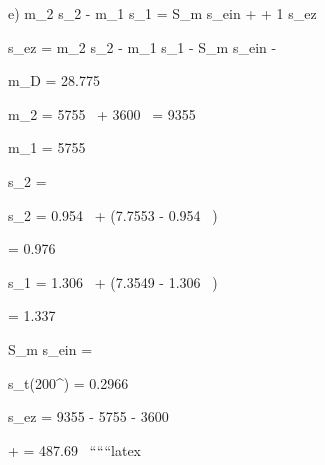 e) \quad m_2 s_2 - m_1 s_1 = S_m s_{ein} +  + 1 s_{ez}

\quad s_{ez} = m_2 s_2 - m_1 s_1 - S_m s_{ein} - 

 \quad m_D = 28.775 \, 

\quad m_2 = 5755 \,  + 3600 \,  = 9355 \, 

\quad m_1 = 5755 \, 

\quad s_2 = 


\quad s_2 = 0.954 \,  +  \quad (7.7553 - 0.954 \, )

\quad = 0.976 \, 


\quad s_1 = 1.306 \,  +  \quad (7.3549 - 1.306 \, )

\quad = 1.337 \, 

\quad S_m s_{ein} = 

\quad s_t(200^\circ {}) = 0.2966 \, 

\quad s_{ez} = 9355  - 5755  - 3600 

\quad +  = 487.69 \, 
``````latex